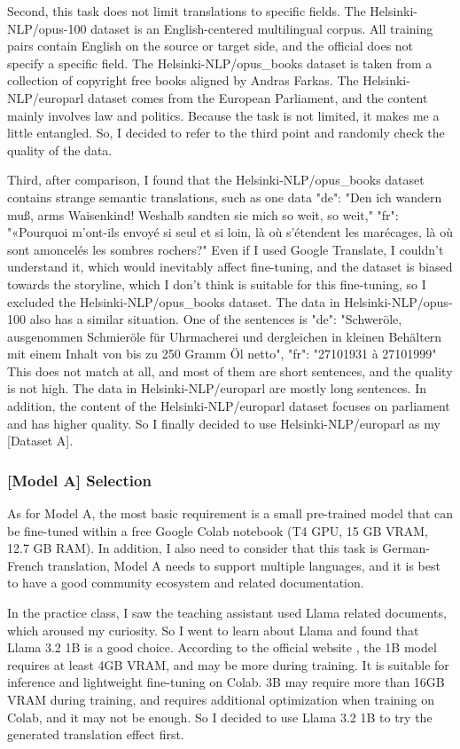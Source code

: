 Second, this task does not limit translations to specific fields.
The Helsinki-NLP/opus-100 dataset is an English-centered multilingual corpus.
All training pairs contain English on the source or target side,
and the official does not specify a specific field.
The Helsinki-NLP/opus\_books dataset is taken from
a collection of copyright free books aligned by Andras Farkas.
The Helsinki-NLP/europarl dataset comes from the European Parliament, 
and the content mainly involves law and politics. 
Because the task is not limited, it makes me a little entangled.
So, I decided to refer to the third point and randomly check the quality of the data.

Third, after comparison,
I found that the Helsinki-NLP/opus\_books dataset contains strange semantic translations, 
such as one data "de": "Den ich wandern muß, arms Waisenkind! Weshalb sandten sie mich so weit, so weit," 
"fr": "«Pourquoi m'ont-ils envoyé si seul et si loin, là où s'étendent les marécages, 
là où sont amoncelés les sombres rochers?" 
Even if I used Google Translate, I couldn't understand it, 
which would inevitably affect fine-tuning, 
and the dataset is biased towards the storyline, 
which I don't think is suitable for this fine-tuning, 
so I excluded the Helsinki-NLP/opus\_books dataset.
The data in Helsinki-NLP/opus-100 also has a similar situation. 
One of the sentences is "de": "Schweröle, ausgenommen Schmieröle für 
Uhrmacherei und dergleichen in kleinen Behältern mit einem Inhalt von 
bis zu 250 Gramm Öl netto", "fr": "27101931 à 27101999" 
This does not match at all, and most of them are short sentences, 
and the quality is not high. The data in Helsinki-NLP/europarl are mostly long sentences. 
In addition, the content of the Helsinki-NLP/europarl dataset focuses on parliament and has higher quality. 
So I finally decided to use Helsinki-NLP/europarl as my [Dataset A].

\subsubsection{[Model A] Selection}
As for Model A, 
the most basic requirement is a small pre-trained model 
that can be fine-tuned within a free Google Colab notebook 
(T4 GPU, 15 GB VRAM, 12.7 GB RAM). 
In addition, I also need to consider that this task is German-French translation, 
Model A needs to support multiple languages, 
and it is best to have a good community ecosystem and related documentation.

In the practice class, 
I saw the teaching assistant used Llama related documents, 
which aroused my curiosity. 
So I went to learn about Llama and found that Llama 3.2 1B is a good choice. 
According to the official website \cite{llama-website}, 
the 1B model requires at least 4GB VRAM, and may be more during training. 
It is suitable for inference and lightweight fine-tuning on Colab.
3B may require more than 16GB VRAM during training, 
and requires additional optimization when training on Colab, and it may not be enough. 
So I decided to use Llama 3.2 1B to try the generated translation effect first.

